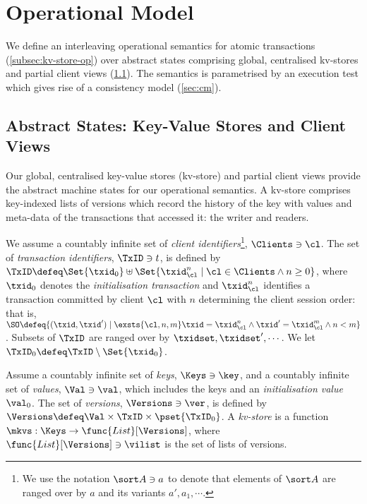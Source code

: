 \section{Operational Model}
\label{sec:model}

We define an interleaving operational semantics  for atomic transactions (\cref{subsec:kv-store-op}) over
abstract states comprising global, centralised kv-stores and partial client views (\cref{subsec:kvstores}). 
The semantics is parametrised by an execution test which gives rise of a consistency model (\cref{sec:cm}).

\subsection{Abstract States: Key-Value Stores and Client Views}
\label{subsec:kvstores}
\label{sec:mkvs-view}
Our global, centralised key-value stores (kv-store) and partial client views
provide the abstract machine states for our operational semantics. A
kv-store comprises key-indexed lists of versions which record
the history of the key with values and meta-data of the
transactions that accessed it: the writer and readers.

We assume a countably infinite set of \emph{client identifiers}\footnote{ We use the notation
 \(\sort A \ni a\) to denote that elements of \(\sort A\) are ranged over
  by \(a\) and its variants \(a', a_1, \cdots\).},
\(\Clients \ni \cl\).
The set of \emph{transaction identifiers}, \(\TxID \ni t\), 
 is defined by
\(\TxID \defeq  \Set{\txid_{0}} \uplus \Set{ \txid_{\cl}^{n} \mid \cl \in \Clients \land n \geq 0 }\), 
where  \(\txid_0\) denotes  the  \emph{initialisation transaction}
and \(\txid_{\cl}^{n}\) identifies a transaction committed by client
\(\cl\) with \(n\)  determining  the client session order: that is, 
\(\SO \defeq \{ (\txid, \txid') \mid \exsts{ \cl, n,m } \txid = \txid_{\cl}^{n} \land \allowbreak \txid' = \txid_{\cl}^{m} \land \allowbreak n < m\}\).
Subsets of \(\TxID\)  are ranged over by \(\txidset, \txidset', \cdots\). 
We let \(\TxID_{0} \defeq \TxID \setminus \Set{\txid_0}\). 

\SpaceAboveDef
\begin{definition}[Kv-stores]
\label{def:his_heap}
\label{def:mkvs}
Assume a countably infinite set of \emph{keys}, \(\Keys \ni \key\), 
and a countably infinite set of  \emph{values}, \(\Val \ni \val\), 
which includes the keys and an \emph{initialisation value} \(\val_0\).
The set of \emph{versions}, \(\Versions \ni \ver\), is defined by \(\Versions \defeq \Val \times \TxID \times \pset{\TxID_{0}}\). 
A \emph{kv-store} 
is a function \(\mkvs: \Keys \to \func{List}[\Versions]\), 
where \(\func{List}[\Versions] \ni \vilist\) is the set of lists of versions. %
\end{definition}
\SpaceBelowDef

